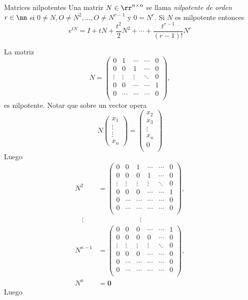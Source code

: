 \begin{ejemplo}{Matrices nilpotentes} Una matriz $N\in\rr^{n\times n}$ se llama \emph{nilpotente de orden $r\in\nn$}
si $ 0 \neq N, O\neq N^{2}, \ldots, O \neq N^{r-1}$ y $ 0=N^{r}$.
Si $N$ es milpotente entonces
$$
e^{t N}=I+t N+\frac{t^{2}}{2} N^{2}+\cdots+\frac{t^{r-1}}{(r-1) !} N^{r}
$$


La matriz
$$
N=\begin{pmatrix}
0 & 1 & \cdots &\cdots & 0 \\
0 & 0 & 1 & \cdots & 0 \\
\vdots &\vdots &\vdots &\ddots &0\\
0 & 0 & \cdots & \cdots &  1 \\
0 & \cdots & \cdots & \cdots &0\\
\end{pmatrix},
$$
es nilpotente. Notar que sobre un vector  opera
$$
N\begin{pmatrix}
x_{1} \\
\vdots\\
\vdots\\
x_{n}
\end{pmatrix}=
\begin{pmatrix}
x_{2} \\
x_{3} \\
\vdots\\
x_n\\
0\\
\end{pmatrix}
$$
Luego
\[
\begin{split}
    N^2&=\begin{pmatrix}
0 & 0&  1 & \cdots &\cdots & 0 \\
0 & 0 & 0 & 1 & \cdots & 0 \\
\vdots &\vdots &\vdots &\vdots &\ddots &0\\
0 & 0 & 0 & \cdots & \cdots &  1 \\
0 & \cdots & \cdots& \cdots & \cdots &0\\
0 & \cdots & \cdots & \cdots & \cdots &0\\
\end{pmatrix},\\
\quad \vdots &\qquad\qquad\qquad  \vdots \\
    N^{n-1}&=\begin{pmatrix}
0 & 0&  0 & \cdots &\cdots & 1 \\
0 & 0 & 0 & 0 & \cdots & 0 \\
\vdots &\vdots &\vdots &\vdots &\ddots &0\\
0 & 0 & 0 & \cdots & \cdots &  0 \\
0 & \cdots & \cdots& \cdots & \cdots &0\\
0 & \cdots & \cdots & \cdots & \cdots &0\\
\end{pmatrix},\\
N^n&=\boldsymbol{0}
\end{split}
\]
Luego


\end{ejemplo}
